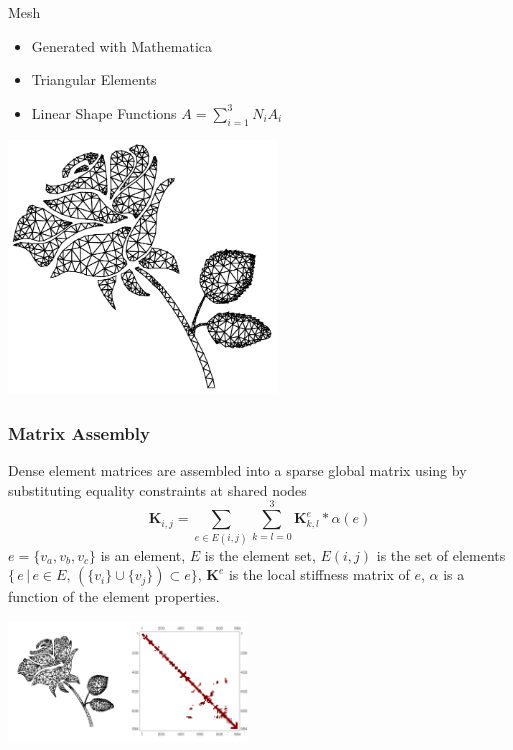 \documentclass{beamer}
\begin{document}
    \begin{frame}{Mesh}
        \begin{itemize}
            \item Generated with Mathematica
            \item Triangular Elements
            \item Linear Shape Functions
            $A=\sum_{i=1}^{3}N_{i}A_i$
        \end{itemize}
        \begin{center}
            \includegraphics[width=2.8in]{rosemesh.pdf}
        \end{center}
    \end{frame}
    \begin{frame}[fragile]
        \frametitle{Matrix Assembly}
        Dense element matrices are assembled into a sparse global matrix using by substituting equality constraints at shared nodes
        \[\mathbf{K}_{i,j}=\sum_{e\in E(i,j)}\sum_{k=l=0}^{3} \mathbf{K}^{e}_{k,l}*\alpha(e)\]
        $e=\{v_a,v_b,v_c\}$ is an element, $E$ is the element set, $E(i,j)$ is the set of elements $\{\,e\,|\,e\in E,\,\left(\{v_i\}\cup\{v_j\}\right)\subset e\}$, $\mathbf{K}^{e}$ is the local stiffness matrix of $e$, $\alpha$ is a function of the element properties.\\
        \begin{center}
            \includegraphics[width=2.5in]{meshmatrix.png}
        \end{center}
    \end{frame}
\end{document}
